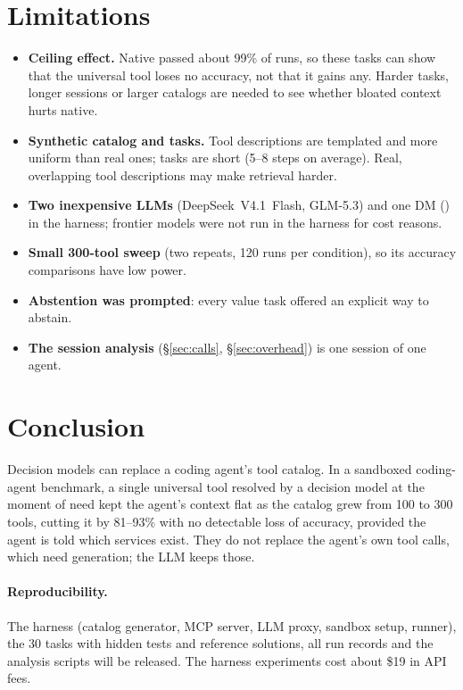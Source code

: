 \section{Limitations}\label{sec:limitations}
\begin{itemize}
\item \textbf{Ceiling effect.} Native passed about 99\% of runs, so these tasks can show that the universal tool
loses no accuracy, not that it gains any. Harder tasks, longer sessions or larger catalogs are needed to see
whether bloated context hurts native.
\item \textbf{Synthetic catalog and tasks.} Tool descriptions are templated and more uniform than real ones; tasks
are short (5--8 steps on average). Real, overlapping tool descriptions may make retrieval harder.
\item \textbf{Two inexpensive LLMs} (DeepSeek~V4.1~Flash, GLM-5.3) and one DM (\msd{}) in the harness; frontier
models were not run in the harness for cost reasons.
\item \textbf{Small 300-tool sweep} (two repeats, 120 runs per condition), so its accuracy comparisons have low power.
\item \textbf{Abstention was prompted}: every value task offered an explicit way to abstain.
\item \textbf{The session analysis} (\S\ref{sec:calls}, \S\ref{sec:overhead}) is one session of one agent.
\end{itemize}

\section{Conclusion}
Decision models can replace a coding agent's tool catalog. In a sandboxed coding-agent benchmark, a single
universal tool resolved by a decision model at the moment of need kept the agent's context flat as the catalog
grew from 100 to 300 tools, cutting it by 81--93\% with no detectable loss of accuracy, provided the agent is
told which services exist. They do not replace the agent's own tool calls, which need generation; the LLM keeps
those.

\paragraph{Reproducibility.} The harness (catalog generator, MCP server, LLM proxy, sandbox setup, runner), the
30 tasks with hidden tests and reference solutions, all run records and the analysis scripts will be released.
The harness experiments cost about \$19 in API fees.

